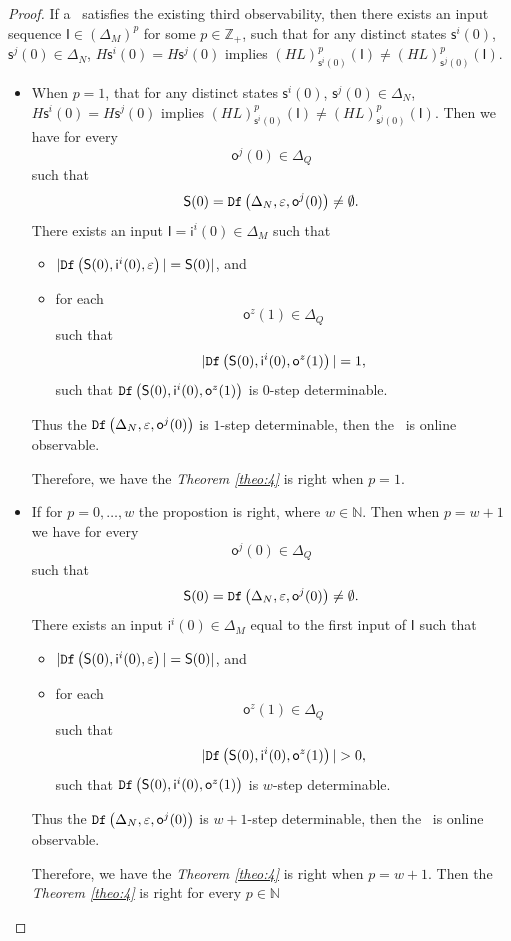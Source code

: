 \begin{proof}
If a \BCN\ satisfies the existing third observability, then there exists an input sequence $\mathsf{I}\in(\Delta_M)^p$ for some $p\in \mathbb{Z}_+$, such that for any distinct states $\mathsf{s}^{i}(0)$, $\mathsf{s}^{j}(0) \in \Delta_N$, $H\mathsf{s}^{i}(0)=H\mathsf{s}^{j}(0)$ implies $(HL)^p_{\mathsf{s}^{i}(0)}(\mathsf{I})\neq (HL)^p_{\mathsf{s}^{j}(0)}(\mathsf{I})$.
\begin{itemize}
\item When $p=1$, that for any distinct states $\mathsf{s}^{i}(0)$, $\mathsf{s}^{j}(0) \in \Delta_N$, $H\mathsf{s}^{i}(0)=H\mathsf{s}^{j}(0)$ implies $(HL)^p_{\mathsf{s}^{i}(0)}(\mathsf{I})\neq (HL)^p_{\mathsf{s}^{j}(0)}(\mathsf{I})$. Then we have for every \[\mathsf{o}^{j}(0)\in \Delta_Q\] such that \[\mathsf{S}(0)={\tt Df}\left(\Delta_N,\varepsilon, \mathsf{o}^{j}(0)\right)\ne\emptyset.\] 
 There exists an input $\mathsf{I}=\mathsf{i}^{i}(0) \in \Delta_M$ such that
 \begin{itemize}
 \item  $|{\tt Df}\left(\mathsf{S}(0),\mathsf{i}^{i}(0),\varepsilon\right)|=\mathsf{S}(0)|$, and 
 \item  for each \[\mathsf{o}^{z}(1)\in \Delta_Q\] such that \[|{\tt Df}\left(\mathsf{S}(0),\mathsf{i}^{i}(0),\mathsf{o}^{z}(1)\right)|=1,\] such that ${\tt Df}\left(\mathsf{S}(0),\mathsf{i}^{i}(0),\mathsf{o}^{z}(1)\right)$ is $0$-step determinable.
 \end{itemize}
Thus the ${\tt Df}\left(\Delta_N,\varepsilon,\mathsf{o}^{j}(0)\right)$ is $1$-step determinable, then the \BCN\ is online observable.

Therefore, we have the {\em Theorem \ref{theo:4}} is right when $p=1$.
\item If for $p=0,\ldots, w$ the propostion is right, where $w\in\mathbb{N}$. Then when $p=w+1$ we have for every \[\mathsf{o}^{j}(0)\in \Delta_Q\] such that \[\mathsf{S}(0)={\tt Df}\left(\Delta_N,\varepsilon, \mathsf{o}^{j}(0)\right)\ne\emptyset.\] 
 There exists an input $\mathsf{i}^{i}(0) \in \Delta_M$ equal to the first input of $\mathsf{I}$ such that
 \begin{itemize}
 \item  $|{\tt Df}\left(\mathsf{S}(0),\mathsf{i}^{i}(0),\varepsilon\right)|=\mathsf{S}(0)|$, and 
 \item  for each \[\mathsf{o}^{z}(1)\in \Delta_Q\] such that \[|\Ded\left(\mathsf{S}(0),\mathsf{i}^{i}(0),\mathsf{o}^{z}(1)\right)|>0,\] such that ${\tt Df}\left(\mathsf{S}(0),\mathsf{i}^{i}(0),\mathsf{o}^{z}(1)\right)$ is $w$-step determinable.
 \end{itemize}
Thus the ${\tt Df}\left(\Delta_N,\varepsilon,\mathsf{o}^{j}(0)\right)$ is $w+1$-step determinable, then the \BCN\ is online observable.

Therefore, we have the {\em Theorem \ref{theo:4}} is right when $p=w+1$. Then the {\em Theorem \ref{theo:4}} is right for every $p \in \mathbb{N}$
 \end{itemize}
\end{proof}

